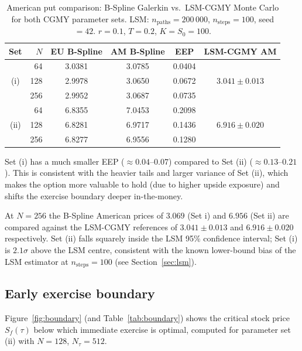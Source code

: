 \documentclass[11pt,a4paper]{article}
\begin{document}
\begin{table}[ht]
\centering
\caption{American put comparison: B-Spline Galerkin vs.\ LSM-CGMY Monte Carlo
  for both CGMY parameter sets.
  LSM: $n_{\mathrm{paths}}=200\,000$, $n_{\mathrm{steps}}=100$, seed $=42$.
  $r=0.1$, $T=0.2$, $K=S_0=100$.}
\label{tab:comparison}
\begin{tabular}{crcccc}
\toprule
Set & $N$ & EU B-Spline & AM B-Spline & EEP & LSM-CGMY AM \\
\midrule
\multirow{3}{*}{(i)} & 64  & 3.0381 & 3.0785 & 0.0404 & \multirow{3}{*}{$3.041\pm 0.013$} \\
                     & 128 & 2.9978 & 3.0650 & 0.0672 &                                   \\
                     & 256 & 2.9952 & 3.0687 & 0.0735 &                                   \\
\midrule
\multirow{3}{*}{(ii)}& 64  & 6.8355 & 7.0453 & 0.2098 & \multirow{3}{*}{$6.916\pm 0.020$} \\
                     & 128 & 6.8281 & 6.9717 & 0.1436 &                                   \\
                     & 256 & 6.8277 & 6.9556 & 0.1280 &                                   \\
\bottomrule
\end{tabular}
\end{table}

Set (i) has a much smaller EEP ($\approx 0.04$--$0.07$) compared to Set (ii)
($\approx 0.13$--$0.21$). This is consistent with the heavier tails and larger
variance of Set (ii), which makes the option more valuable to hold (due to
higher upside exposure) and shifts the exercise boundary deeper in-the-money.

At $N=256$ the B-Spline American prices of $3.069$ (Set i) and $6.956$
(Set ii) are compared against the LSM-CGMY references of $3.041\pm 0.013$
and $6.916\pm 0.020$ respectively.  Set (ii) falls squarely inside the
LSM 95\% confidence interval; Set (i) is $2.1\sigma$ above the LSM centre,
consistent with the known lower-bound bias of the LSM estimator at
$n_{\mathrm{steps}}=100$ (see Section~\ref{sec:lsm}).

\subsection{Early exercise boundary}

Figure~\ref{fig:boundary} (and Table~\ref{tab:boundary}) shows the critical
stock price $S_f(\tau)$ below which immediate exercise is optimal, computed
for parameter set (ii) with $N=128$, $N_\tau=512$.
\end{document}
